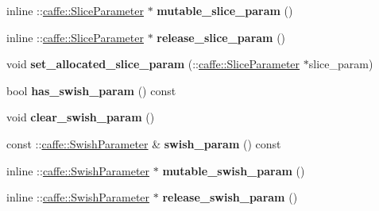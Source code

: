 \begin{DoxyCompactItemize}
inline \+::\mbox{\hyperlink{classcaffe_1_1_slice_parameter}{caffe\+::\+Slice\+Parameter}} $\ast$ {\bfseries mutable\+\_\+slice\+\_\+param} ()
\item 
\mbox{\label{classcaffe_1_1_layer_parameter_a861d5288a6bf94f451e7af2b4054862b}} 
inline \+::\mbox{\hyperlink{classcaffe_1_1_slice_parameter}{caffe\+::\+Slice\+Parameter}} $\ast$ {\bfseries release\+\_\+slice\+\_\+param} ()
\item 
\mbox{\label{classcaffe_1_1_layer_parameter_ab8cacd8082f549af7a5811feb348bddb}} 
void {\bfseries set\+\_\+allocated\+\_\+slice\+\_\+param} (\+::\mbox{\hyperlink{classcaffe_1_1_slice_parameter}{caffe\+::\+Slice\+Parameter}} $\ast$slice\+\_\+param)
\item 
\mbox{\label{classcaffe_1_1_layer_parameter_ad8e261997278055c446b27661b2021d0}} 
bool {\bfseries has\+\_\+swish\+\_\+param} () const
\item 
\mbox{\label{classcaffe_1_1_layer_parameter_a02a951bce0c33db2eb964d6c1819becd}} 
void {\bfseries clear\+\_\+swish\+\_\+param} ()
\item 
\mbox{\label{classcaffe_1_1_layer_parameter_ac1a2652dfd7d11c500901268572e2753}} 
const \+::\mbox{\hyperlink{classcaffe_1_1_swish_parameter}{caffe\+::\+Swish\+Parameter}} \& {\bfseries swish\+\_\+param} () const
\item 
\mbox{\label{classcaffe_1_1_layer_parameter_adeaeb623c95679f66264715911e9df47}} 
inline \+::\mbox{\hyperlink{classcaffe_1_1_swish_parameter}{caffe\+::\+Swish\+Parameter}} $\ast$ {\bfseries mutable\+\_\+swish\+\_\+param} ()
\item 
\mbox{\label{classcaffe_1_1_layer_parameter_adede5ad99665ab4940a11503b2d7121c}} 
inline \+::\mbox{\hyperlink{classcaffe_1_1_swish_parameter}{caffe\+::\+Swish\+Parameter}} $\ast$ {\bfseries release\+\_\+swish\+\_\+param} ()
\item 
\mbox{\label{classcaffe_1_1_layer_parameter_a55e400176ccf3830ead409db9bac7aa1}} 

\end{DoxyCompactItemize}
